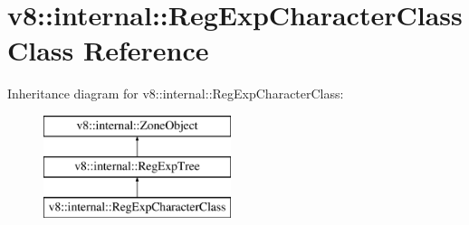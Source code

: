 \hypertarget{classv8_1_1internal_1_1_reg_exp_character_class}{}\section{v8\+:\+:internal\+:\+:Reg\+Exp\+Character\+Class Class Reference}
\label{classv8_1_1internal_1_1_reg_exp_character_class}
Inheritance diagram for v8\+:\+:internal\+:\+:Reg\+Exp\+Character\+Class\+:\begin{figure}[H]
\begin{center}
\leavevmode
\includegraphics[height=3.000000cm]{classv8_1_1internal_1_1_reg_exp_character_class}
\end{center}
\end{figure}
